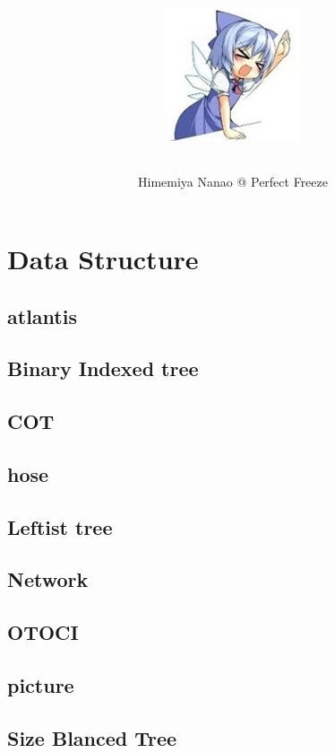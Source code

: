 \documentclass[a4paper,5pt,twocolumn,titlepage]{article}
\title{\TitleFont{Code Library}
\begin{center}
\includegraphics[scale=2]{./image1.png}
\end{center}
}
\author{Himemiya Nanao @ Perfect Freeze}
\begin{document}
\maketitle \tableofcontents
\newpage
{}


\section{Data Structure}
\subsection{atlantis}

\subsection{Binary Indexed tree}

\subsection{COT}

\subsection{hose}

\subsection{Leftist tree}

\subsection{Network}

\subsection{OTOCI}

\subsection{picture}

\subsection{Size Blanced Tree}

\end{document}
